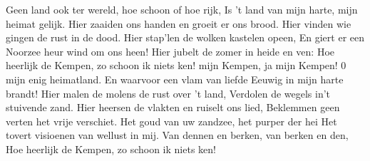 \beginverse*
Geen land ook ter wereld, hoe schoon of hoe rijk,
Is 't land van mijn harte, mijn heimat gelijk.
Hier zaaiden ons handen en groeit er ons brood.
Hier vinden wie gingen de rust in de dood.
Hier stap'len de wolken kastelen opeen,
En giert er een Noorzee heur wind om ons heen!
Hier jubelt de zomer in heide en ven:
Hoe heerlijk de Kempen, zo schoon ik niets ken!
\endverse
{} mijn Kempen, ja mijn Kempen!
0 mijn enig heimatland.
En waarvoor een vlam van liefde
Eeuwig in mijn harte brandt!
\endchorus
\beginverse*
Hier malen de molens de rust over 't land,
Verdolen de wegels in't stuivende zand.
Hier heersen de vlakten en ruiselt ons lied,
Beklemmen geen verten het vrije verschiet.
Het goud van uw zandzee, het purper der hei
Het tovert visioenen van wellust in mij.
Van dennen en berken, van berken en den,
Hoe heerlijk de Kempen, zo schoon ik niets ken!
\endverse
\endsong 